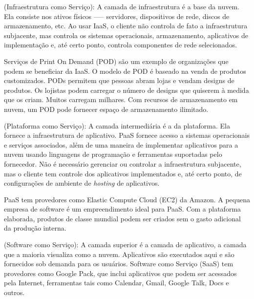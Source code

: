 \begin{itemise}
     (Infraestrutura como Serviço): A
    camada de infraestrutura é a base da nuvem. Ela consiste nos ativos físicos —--
    servidores, dispositivos de rede, discos de armazenamento, etc. Ao usar IaaS,
    o cliente não controla de fato a infraestrutura subjacente, mas controla os
    sistemas operacionais, armazenamento, aplicativos de implementação e, até certo
    ponto, controla componentes de rede selecionados. 
    
    Serviços de Print On Demand (POD) são um exemplo de organizações que podem se
    beneficiar da IaaS. O modelo de POD é baseado na venda de produtos customizados.
    PODs permitem que pessoas abram lojas e vendam designs de produtos. Os lojistas
    podem carregar o número de designs que quiserem à medida que os criam. Muitos
    carregam milhares. Com recursos de armazenamento em nuvem, um POD pode fornecer
    espaço de armazenamento ilimitado.
    
     (Plataforma como Serviço): A camada
    intermediária é a da plataforma. Ela fornece a infraestrutura de aplicativo.
    PaaS fornece acesso a sistemas operacionais e serviços associados, além de uma
    maneira de implementar aplicativos para a nuvem usando linguagens de programação
    e ferramentas suportadas pelo fornecedor. Não é necessário gerenciar ou
    controlar a infraestrutura subjacente, mas o cliente tem controle dos
    aplicativos implementados e, até certo ponto, de configurações de ambiente de
    \emph{hosting} de aplicativos. 
    
    PaaS tem provedores como Elastic Compute Cloud (EC2) da Amazon. A pequena 
empresa de software é um empreendimento ideal para PaaS. Com a plataforma elaborada,
produtos de classe mundial podem ser criados sem o gasto adicional da produção
interna.
    
     (Software como Serviço): A camada
    superior é a camada de aplicativo, a camada que a maioria visualiza como a
    nuvem. Aplicativos são executados aqui e são fornecidos sob demanda para os
    usuários. Software como Serviço (SaaS) tem provedores como Google Pack, que
    inclui aplicativos que podem ser acessados pela Internet, ferramentas tais como
    Calendar, Gmail, Google Talk, Docs e outros.
\end{itemise}

